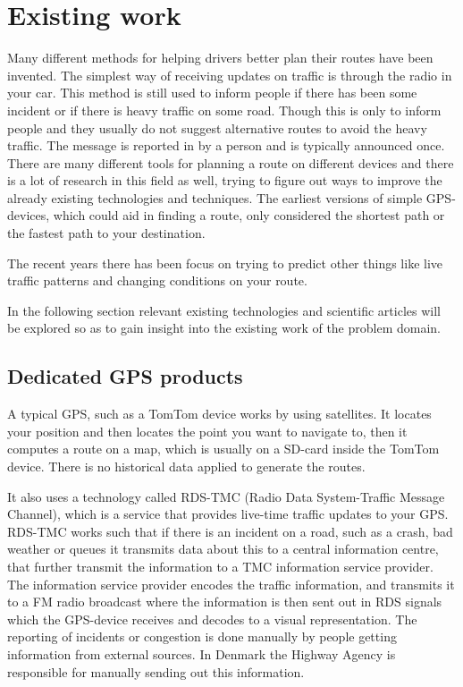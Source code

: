 \section{Existing work}\label{sec:existingwork}
Many different methods for helping drivers better plan their routes have been invented.
The simplest way of receiving updates on traffic is through the radio in your car. This method is still used to inform people if there has been some incident or if there is heavy traffic on some road. Though this is only to inform people and they usually do not suggest alternative routes to avoid the heavy traffic. The message is reported in by a person and is typically announced once.
There are many different tools for planning a route on different devices and there is a lot of research in this field as well, trying to figure out ways to improve the already existing technologies and techniques. The earliest versions of simple GPS-devices, which could aid in finding a route, only considered the shortest path or the fastest path to your destination.

The recent years there has been focus on trying to predict other things like live traffic patterns and changing conditions on your route.\cite{GoogleMapPrediction}

In the following section relevant existing technologies and scientific articles will be explored so as to gain insight into the existing work of the problem domain.
\subsection*{Dedicated GPS products}
A typical GPS, such as a TomTom device works by using satellites. It locates your position and then locates the point you want to navigate to, then it computes a route on a map, which is usually on a SD-card inside the TomTom device. There is no historical data applied to generate the routes.

It also uses a technology called RDS-TMC (Radio Data System-Traffic Message Channel), which is a service that provides live-time traffic updates to your GPS. RDS-TMC works such that if there is an incident on a road, such as a crash, bad weather or queues it transmits data about this to a central information centre, that further transmit the information to a TMC information service provider. The information service provider encodes the traffic information, and transmits it to a FM radio broadcast where the information is then sent out in RDS signals which the GPS-device receives and decodes to a visual representation. The reporting of incidents or congestion is done manually by people getting information from external sources. In Denmark the Highway Agency is responsible for manually sending out this information\cite{Vejdirektorat}.

